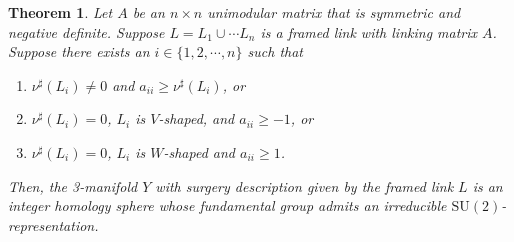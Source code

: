 \documentclass[11pt]{amsart}
\newtheorem{theorem}{Theorem}[section]
\newcommand\SU{\mathrm{SU}}
\begin{document}
\begin{theorem}\label{thm:nu} Let $A$ be an $n\times n$ unimodular matrix that is symmetric and negative definite. Suppose $L = L_1\cup\cdots L_n$ is a framed link with linking matrix $A$. Suppose there exists an $i\in\{1,2,\cdots, n\}$ such that
\begin{enumerate}
\item $\nu^\sharp(L_i)\neq 0$ and $a_{ii}\geq \nu^\sharp(L_i)$, or
\item $\nu^\sharp(L_i)=0$, $L_i$ is $V$-shaped, and $a_{ii}\geq -1$, or
\item $\nu^\sharp(L_i)=0$, $L_i$ is $W$-shaped and $a_{ii}\geq 1$.
\end{enumerate}Then, the 3-manifold $Y$ with surgery description given by the framed link $L$ is an integer homology sphere whose fundamental group admits an irreducible $\SU(2)$-representation.
\end{theorem}
\end{document}
